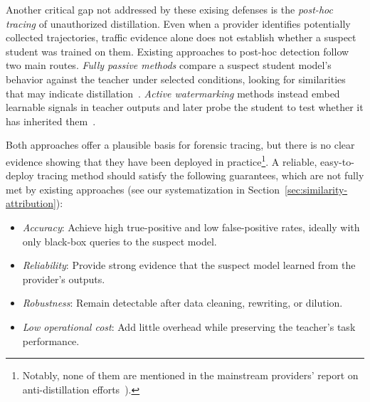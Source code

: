 Another critical gap not addressed by these exising defenses is the \emph{post-hoc tracing} of unauthorized distillation.
Even when a provider identifies potentially collected trajectories, traffic evidence alone does not establish whether a suspect student was trained on them.
Existing approaches to post-hoc detection follow two main routes.
\emph{Fully passive methods} compare a suspect student model's behavior against the teacher under selected conditions, looking for similarities that may indicate distillation~\cite{yang2026agents,rawat2026reference,panfilov2026stealing}.
\emph{Active watermarking} methods instead embed learnable signals in teacher outputs and later probe the student to test whether it has inherited them~\cite{xu2026antidistillation,wang2026protecting,an2026sequential}.

Both approaches offer a plausible basis for forensic tracing, but there is no clear evidence showing that they have been deployed in practice\footnote{Notably, none of them are mentioned in the mainstream providers' report on anti-distillation efforts~\cite{}).}.
A reliable, easy-to-deploy tracing method should satisfy the following guarantees, which are not fully met by existing approaches (see our systematization in Section~\ref{sec:similarity-attribution}):
\begin{itemize}[\setlength{\IEEElabelindent}{0pt}]
    \item \emph{Accuracy}: Achieve high true-positive and low false-positive rates, ideally with only black-box queries to the suspect model.

    \item \emph{Reliability}: Provide strong evidence that the suspect model learned from the provider's outputs.

    \item \emph{Robustness}: Remain detectable after data cleaning, rewriting, or dilution.

    \item \emph{Low operational cost}: Add little overhead while preserving the teacher's task performance.

\end{itemize}

